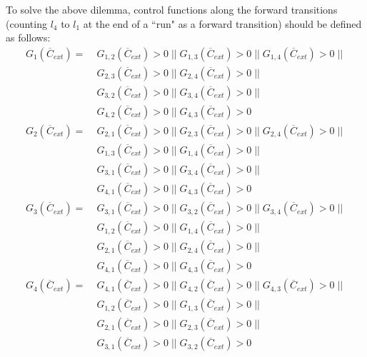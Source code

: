
To solve the above dilemma, control functions along the forward transitions (counting $l_4$ to $l_1$ at the end of a ``run" as a forward transition) should be defined as follows:
\begin{equation*}
    \begin{split}
        G_{1}(\overline{C}_{ext}) = \; & G_{1,2}(\overline{C}_{ext}) > 0 \; || \; G_{1,3}(\overline{C}_{ext}) > 0 \; || \; G_{1,4}(\overline{C}_{ext}) > 0 \; || \; \\
         & G_{2,3}(\overline{C}_{ext}) > 0 \; || \; G_{2,4}(\overline{C}_{ext}) > 0 \; || \; \\
         & G_{3,2}(\overline{C}_{ext}) > 0 \; || \; G_{3,4}(\overline{C}_{ext}) > 0 \; || \; \\
         & G_{4,2}(\overline{C}_{ext}) > 0 \; || \; G_{4,3}(\overline{C}_{ext}) > 0 \\
         G_{2}(\overline{C}_{ext}) = \; & G_{2,1}(\overline{C}_{ext}) > 0 \; || \; G_{2,3}(\overline{C}_{ext}) > 0 \; || \; G_{2,4}(\overline{C}_{ext}) > 0 \; || \; \\
         & G_{1,3}(\overline{C}_{ext}) > 0 \; || \; G_{1,4}(\overline{C}_{ext}) > 0 \; || \; \\
         & G_{3,1}(\overline{C}_{ext}) > 0 \; || \; G_{3,4}(\overline{C}_{ext}) > 0 \; || \; \\
         & G_{4,1}(\overline{C}_{ext}) > 0 \; || \; G_{4,3}(\overline{C}_{ext}) > 0 \\
         G_{3}(\overline{C}_{ext}) = \; & G_{3,1}(\overline{C}_{ext}) > 0 \; || \; G_{3,2}(\overline{C}_{ext}) > 0 \; || \; G_{3,4}(\overline{C}_{ext}) > 0 \; || \; \\
         & G_{1,2}(\overline{C}_{ext}) > 0 \; || \; G_{1,4}(\overline{C}_{ext}) > 0 \; || \; \\
         & G_{2,1}(\overline{C}_{ext}) > 0 \; || \; G_{2,4}(\overline{C}_{ext}) > 0 \; || \; \\
         & G_{4,1}(\overline{C}_{ext}) > 0 \; || \; G_{4,3}(\overline{C}_{ext}) > 0 \\
         G_{4}(\overline{C}_{ext}) = \; & G_{4,1}(\overline{C}_{ext}) > 0 \; || \; G_{4,2}(\overline{C}_{ext}) > 0 \; || \; G_{4,3}(\overline{C}_{ext}) > 0 \; || \; \\
         & G_{1,2}(\overline{C}_{ext}) > 0 \; || \; G_{1,3}(\overline{C}_{ext}) > 0 \; || \; \\
         & G_{2,1}(\overline{C}_{ext}) > 0 \; || \; G_{2,3}(\overline{C}_{ext}) > 0 \; || \; \\
         & G_{3,1}(\overline{C}_{ext}) > 0 \; || \; G_{3,2}(\overline{C}_{ext}) > 0 \\
    \end{split}
\end{equation*}

